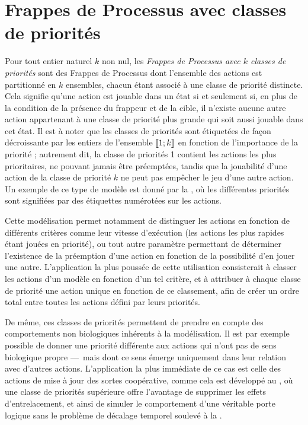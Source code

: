 \section{Frappes de Processus avec classes de priorités}

Pour tout entier naturel $k$ non nul,
les \emph{Frappes de Processus avec $k$ classes de priorités}
sont des Frappes de Processus dont l'ensemble des actions est partitionné
en $k$ ensembles, chacun étant associé à une classe de priorité distincte.
Cela signifie qu'une action est jouable dans un état si et seulement si,
en plus de la condition de la présence du frappeur et de la cible,
il n'existe aucune autre action appartenant à une classe de priorité plus grande
qui soit aussi jouable dans cet état.
Il est à noter que les classes de priorités sont étiquetées de façon décroissante par les entiers de
l'ensemble $\llbracket 1; k \rrbracket$ en fonction de l'importance de la priorité ;
autrement dit, la classe de priorités 1 contient les actions les plus prioritaires,
ne pouvant jamais être préemptées,
tandis que la jouabilité d'une action de la classe de priorité $k$ ne peut pas empêcher le jeu
d'une autre action.
Un exemple de ce type de modèle est donné par la ,
où les différentes priorités sont signifiées par des étiquettes numérotées sur les actions.

Cette modélisation permet notamment de distinguer les actions en fonction 
de différents critères comme
leur vitesse d'exécution (les actions les plus rapides étant jouées en priorité),
ou tout autre paramètre permettant de déterminer l'existence de la préemption d'une action
en fonction de la possibilité d'en jouer une autre.
L'application la plus poussée de cette utilisation consisterait à
classer les actions d'un modèle en fonction d'un tel critère,
et à attribuer à chaque classe de priorité une action unique en fonction de ce classement,
afin de créer un ordre total entre toutes les actions défini par leurs priorités.

De même, ces classes de priorités permettent de prendre en compte des comportements non biologiques
inhérents à la modélisation.
Il est par exemple possible de donner une priorité différente aux
actions qui n'ont pas de sens biologique propre
---~mais dont ce sens émerge uniquement dans leur relation avec d'autres actions.
L'application la plus immédiate de ce cas est celle des actions de mise à jour
des sortes coopérative, comme cela est développé au ,
où une classe de priorités supérieure offre l'avantage de supprimer les effets d'entrelacement,
et ainsi de simuler le comportement d'une véritable porte logique
sans le problème de décalage temporel soulevé à la .

